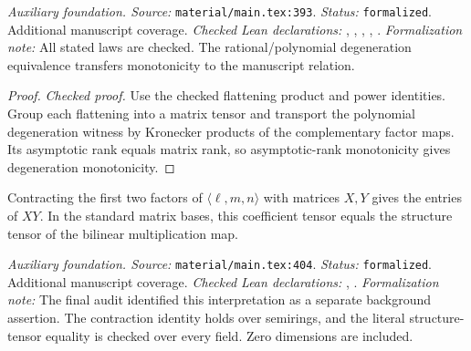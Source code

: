 \noindent\textit{Auxiliary foundation. Source:} \texttt{material/main.tex:393}.
\textit{Status:} \texttt{formalized}. Additional manuscript coverage.
\textit{Checked Lean declarations:} , , , , .
\textit{Formalization note:} All stated laws are checked. The rational/polynomial degeneration equivalence transfers monotonicity to the manuscript relation.

\begin{proof}
\leanok
{}
\textit{Checked proof.} Use the checked flattening product and power identities. Group each flattening into a matrix tensor and transport the polynomial degeneration witness by Kronecker products of the complementary factor maps. Its asymptotic rank equals matrix rank, so asymptotic-rank monotonicity gives degeneration monotonicity.
\end{proof}

\renewcommand{\thetheorem}{A6}
\begin{lemma}
\label{aux:matrix-bilinear-interpretation}
\leanok
{}
Contracting the first two factors of $\langle\ell,m,n\rangle$ with matrices $X,Y$ gives the entries of $XY$. In the standard matrix bases, this coefficient tensor equals the structure tensor of the bilinear multiplication map.
\end{lemma}

\noindent\textit{Auxiliary foundation. Source:} \texttt{material/main.tex:404}.
\textit{Status:} \texttt{formalized}. Additional manuscript coverage.
\textit{Checked Lean declarations:} , .
\textit{Formalization note:} The final audit identified this interpretation as a separate background assertion. The contraction identity holds over semirings, and the literal structure-tensor equality is checked over every field. Zero dimensions are included.

